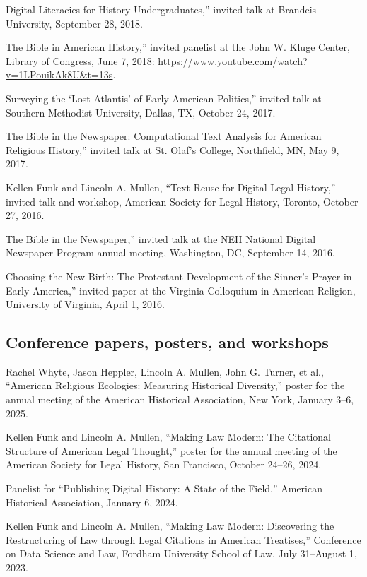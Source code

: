 \documentclass[11pt]{article}
\begin{document}
\noindent{}Digital Literacies for History Undergraduates,'' invited talk at Brandeis University, September 28, 2018.

\noindent{}The Bible in American History,'' invited panelist at the John W. Kluge Center, Library of Congress, June 7, 2018: \url{https://www.youtube.com/watch?v=1LPouikAk8U&t=13s}.

\noindent{}Surveying the `Lost Atlantis' of Early American Politics,'' invited talk at Southern Methodist University, Dallas, TX, October 24, 2017.

\noindent{}The Bible in the Newspaper: Computational Text Analysis for American Religious History,'' invited talk at St. Olaf's College, Northfield, MN, May 9, 2017.

Kellen Funk and Lincoln A. Mullen, ``Text Reuse for Digital Legal History,'' invited talk and workshop, American Society for Legal History, Toronto, October 27, 2016.

\noindent{}The Bible in the Newspaper,'' invited talk at the NEH National Digital Newspaper Program annual meeting, Washington, DC, September 14, 2016.

\noindent{}Choosing the New Birth: The Protestant Development of the Sinner's Prayer in Early America,'' invited paper at the Virginia Colloquium in American Religion, University of Virginia, April 1, 2016.

\subsection{Conference papers, posters, and workshops}\label{Conference papers}

Rachel Whyte, Jason Heppler, Lincoln A. Mullen, John G. Turner, et al., ``American Religious Ecologies: Measuring Historical Diversity,'' poster for the annual meeting of the American Historical Association, New York, January 3--6, 2025.

Kellen Funk and Lincoln A. Mullen, ``Making Law Modern: The Citational Structure of American Legal Thought,'' poster for the annual meeting of the American Society for Legal History, San Francisco, October 24--26, 2024.

Panelist for ``Publishing Digital History: A State of the Field,'' American Historical Association, January 6, 2024.

Kellen Funk and Lincoln A. Mullen, ``Making Law Modern: Discovering the Restructuring of Law through Legal Citations in American Treatises,'' Conference on Data Science and Law, Fordham University School of Law, July 31--August 1, 2023.  
\end{document}
